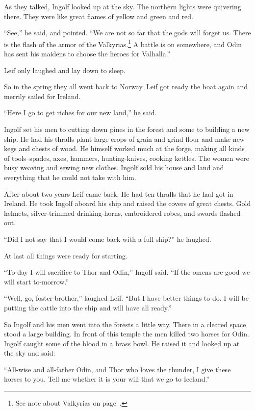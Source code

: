 As they talked, Ingolf looked up at the sky. The northern lights were
quivering there. They were like great flames of yellow and green and
red.

``See,'' he said, and pointed. ``We are not so far that the gods will
forget us. There is the flash of the armor of the Valkyrias.\footnote{See
note about Valkyrias on page~\pageref{valkyrias}.} A battle is on
somewhere, and Odin has sent his maidens to choose the heroes for
Valhalla.''

Leif only laughed and lay down to sleep.

So in the spring they all went back to Norway. Leif got ready the boat
again and merrily sailed for Ireland.

``Here I go to get riches for our new land,'' he said.

Ingolf set his men to cutting down pines in the forest and some to
building a new ship. He had his thralls plant large crops of grain and
grind flour and make new kegs and chests of wood. He himself worked much
at the forge, making all kinds of tools--spades, axes, hammers,
hunting-knives, cooking kettles. The women were busy weaving and sewing
new clothes. Ingolf sold his house and land and everything that he could
not take with him.

After about two years Leif came back. He had ten thralls that he had got
in Ireland. He took Ingolf aboard his ship and raised the covers of
great chests. Gold helmets, silver-trimmed drinking-horns, embroidered
robes, and swords flashed out.

``Did I not say that I would come back with a full ship?'' he laughed.

At last all things were ready for starting.

``To-day I will sacrifice to Thor and Odin,'' Ingolf said. ``If the
omens are good we will start to-morrow.''

``Well, go, foster-brother,'' laughed Leif. ``But I have better things
to do. I will be putting the cattle into the ship and will have all
ready.''

So Ingolf and his men went into the forests a little way. There in a
cleared space stood a large building. In front of this temple the men
killed two horses for Odin. Ingolf caught some of the blood in a brass
bowl. He raised it and looked up at the sky and said:

``All-wise and all-father Odin, and Thor who loves the thunder, I give
these horses to you. Tell me whether it is your will that we go to
Iceland.''


